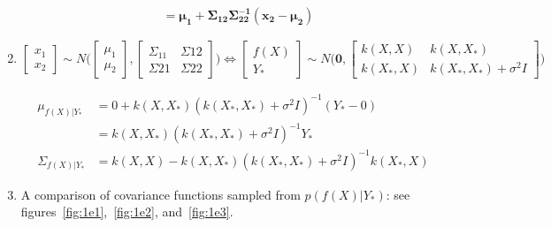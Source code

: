 \documentclass{article}
\begin{document}
\begin{enumerate}[label=(\alph*)]
\begin{align*}
&\bm{=\mu_1+\Sigma_{12}\Sigma_{22}^{-1}(x_2-\mu_2)}
\end{align*}
\item %
\[
\begin{bmatrix}
  x_1 \\ x_2
\end{bmatrix}
\sim{}N \Bigg(
\begin{bmatrix}
  \mu_1 \\ \mu_2
\end{bmatrix}
,
\begin{bmatrix}
  \Sigma_{11} & \Sigma{12} \\ \Sigma{21} & \Sigma{22}
\end{bmatrix}
\Bigg)
\Longleftrightarrow
\begin{bmatrix}
 f(X) \\ Y_\ast
\end{bmatrix}
\sim{}N \Bigg(
  \bm{0},
\begin{bmatrix}
  k(X,X) & k(X,X_\ast) \\ k(X_\ast,X) & k(X_\ast,X_\ast)+\sigma^2I
\end{bmatrix}
\Bigg)
\]

\begin{align*}
\mu_{f(X)|Y_\ast}&=0+k(X,X_\ast)(k(X_\ast,X_\ast)+\sigma^2I)^{-1}(Y_\ast-0) \\
&=k(X,X_\ast)(k(X_\ast,X_\ast)+\sigma^2I)^{-1}Y_\ast \\
\Sigma_{f(X)|Y_\ast}&=k(X,X)-k(X,X_\ast)(k(X_\ast,X_\ast)+\sigma^2I)^{-1}k(X_\ast,X)
\end{align*}

\item A comparison of covariance functions sampled from $p(f(X)|Y_\ast)$: see figures~\ref{fig:1e1},~\ref{fig:1e2}, and~\ref{fig:1e3}.


\end{enumerate}
\end{document}
